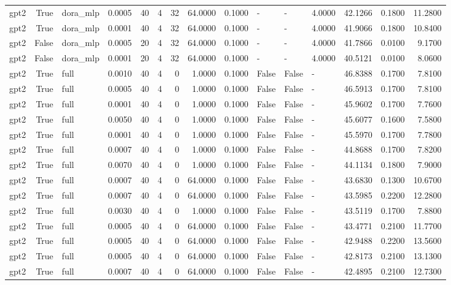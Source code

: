 \begin{tabular}{lrlrrrrrrlllrrr}
gpt2 & True & dora_mlp & 0.0005 & 40 & 4 & 32 & 64.0000 & 0.1000 & - & - & 4.0000 & 42.1266 & 0.1800 & 11.2800 \\
gpt2 & True & dora_mlp & 0.0001 & 40 & 4 & 32 & 64.0000 & 0.1000 & - & - & 4.0000 & 41.9066 & 0.1800 & 10.8400 \\
gpt2 & False & dora_mlp & 0.0005 & 20 & 4 & 32 & 64.0000 & 0.1000 & - & - & 4.0000 & 41.7866 & 0.0100 & 9.1700 \\
gpt2 & False & dora_mlp & 0.0001 & 20 & 4 & 32 & 64.0000 & 0.1000 & - & - & 4.0000 & 40.5121 & 0.0100 & 8.0600 \\
gpt2 & True & full & 0.0010 & 40 & 4 & 0 & 1.0000 & 0.1000 & False & False & - & 46.8388 & 0.1700 & 7.8100 \\
gpt2 & True & full & 0.0005 & 40 & 4 & 0 & 1.0000 & 0.1000 & False & False & - & 46.5913 & 0.1700 & 7.8100 \\
gpt2 & True & full & 0.0001 & 40 & 4 & 0 & 1.0000 & 0.1000 & False & False & - & 45.9602 & 0.1700 & 7.7600 \\
gpt2 & True & full & 0.0050 & 40 & 4 & 0 & 1.0000 & 0.1000 & False & False & - & 45.6077 & 0.1600 & 7.5800 \\
gpt2 & True & full & 0.0001 & 40 & 4 & 0 & 1.0000 & 0.1000 & False & False & - & 45.5970 & 0.1700 & 7.7800 \\
gpt2 & True & full & 0.0007 & 40 & 4 & 0 & 1.0000 & 0.1000 & False & False & - & 44.8688 & 0.1700 & 7.8200 \\
gpt2 & True & full & 0.0070 & 40 & 4 & 0 & 1.0000 & 0.1000 & False & False & - & 44.1134 & 0.1800 & 7.9000 \\
gpt2 & True & full & 0.0007 & 40 & 4 & 0 & 64.0000 & 0.1000 & False & False & - & 43.6830 & 0.1300 & 10.6700 \\
gpt2 & True & full & 0.0007 & 40 & 4 & 0 & 64.0000 & 0.1000 & False & False & - & 43.5985 & 0.2200 & 12.2800 \\
gpt2 & True & full & 0.0030 & 40 & 4 & 0 & 1.0000 & 0.1000 & False & False & - & 43.5119 & 0.1700 & 7.8800 \\
gpt2 & True & full & 0.0005 & 40 & 4 & 0 & 64.0000 & 0.1000 & False & False & - & 43.4771 & 0.2100 & 11.7700 \\
gpt2 & True & full & 0.0005 & 40 & 4 & 0 & 64.0000 & 0.1000 & False & False & - & 42.9488 & 0.2200 & 13.5600 \\
gpt2 & True & full & 0.0005 & 40 & 4 & 0 & 64.0000 & 0.1000 & False & False & - & 42.8173 & 0.2100 & 13.1300 \\
gpt2 & True & full & 0.0007 & 40 & 4 & 0 & 64.0000 & 0.1000 & False & False & - & 42.4895 & 0.2100 & 12.7300 \\

\end{tabular}

